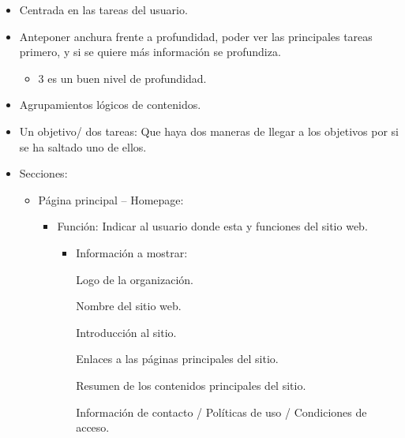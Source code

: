 \documentclass[12pt, twoside, openright]{report} %
\begin{document}
\begin{itemize}
  \item
    Centrada en las tareas del usuario.
  \item
    Anteponer anchura frente a profundidad, poder ver las
    principales tareas primero, y si se quiere más información se
    profundiza.
    \begin{itemize}
      \item
        3 es un buen nivel de profundidad.
    \end{itemize}
  \item
    Agrupamientos lógicos de contenidos.
  \item
    Un objetivo/ dos tareas: Que haya dos maneras de llegar a los
    objetivos por si se ha saltado uno de ellos.
  \item Secciones:
    \begin{itemize}
      \item Página principal -- Homepage:
        \begin{itemize}
          \item Función: Indicar al usuario donde esta y funciones del sitio
            web.
            \begin{itemize}
              \item
                Información a mostrar:

                Logo de la organización.

                Nombre del sitio web.

                Introducción al sitio.

                Enlaces a las páginas principales del sitio.

                Resumen de los contenidos principales del sitio.

                Información de contacto / Políticas de uso / Condiciones
                de acceso.


\end{itemize}
\end{itemize}
\end{itemize}
\end{itemize}
\end{document}
